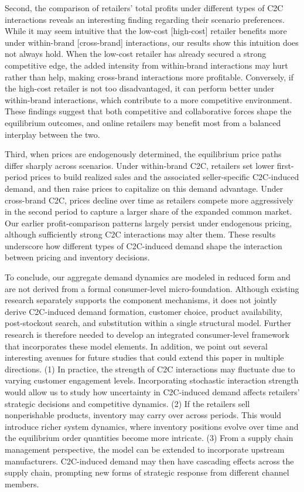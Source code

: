 \documentclass[nonblindrev,copyedit]{informs1}
\begin{document}
Second, the comparison of retailers' total profits under different types of C2C interactions reveals an interesting finding regarding their scenario preferences. While it may seem intuitive that the low-cost [high-cost] retailer benefits more under within-brand [cross-brand] interactions, our results show this intuition does not always hold. When the low-cost retailer has already secured a strong competitive edge, the added intensity from within-brand interactions may hurt rather than help, making cross-brand interactions more profitable. Conversely, if the high-cost retailer is not too disadvantaged, it can perform better under within-brand interactions, which contribute to a more competitive environment. These findings suggest that both competitive and collaborative forces shape the equilibrium outcomes, and online retailers may benefit most from a balanced interplay between the two.

Third, when prices are endogenously determined, the equilibrium price paths differ sharply across scenarios. Under within-brand C2C, retailers set lower first-period prices to build realized sales and the associated seller-specific C2C-induced demand, and then raise prices to capitalize on this demand advantage. Under cross-brand C2C, prices decline over time as retailers compete more aggressively in the second period to capture a larger share of the expanded common market. Our earlier profit-comparison patterns largely persist under endogenous pricing, although sufficiently strong C2C interactions may alter them. These results underscore how different types of C2C-induced demand shape the interaction between pricing and inventory decisions.

To conclude, our aggregate demand dynamics are modeled in reduced form and are not derived from a formal consumer-level micro-foundation. Although existing research separately supports the component mechanisms, it does not jointly derive C2C-induced demand formation, customer choice, product availability, post-stockout search, and substitution within a single structural model. Further research is therefore needed to develop an integrated consumer-level framework that incorporates these model elements. In addition, we point out several interesting avenues for future studies that could extend this paper in multiple directions.
(1) In practice, the strength of C2C interactions may fluctuate due to varying customer engagement levels. Incorporating stochastic interaction strength would allow us to study how uncertainty in C2C-induced demand affects retailers' strategic decisions and competitive dynamics.
(2) If the retailers sell nonperishable products, inventory may carry over across periods. This would introduce richer system dynamics, where inventory positions evolve over time and the equilibrium order quantities become more intricate.
(3) From a supply chain management perspective, the model can be extended to incorporate upstream manufacturers. C2C-induced demand may then have cascading effects across the supply chain, prompting new forms of strategic response from different channel members.
\end{document}
